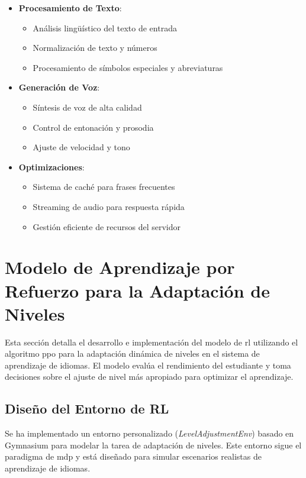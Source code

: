 \begin{itemize}
    \item \textbf{Procesamiento de Texto}:
    \begin{itemize}
        \item Análisis lingüístico del texto de entrada
        \item Normalización de texto y números
        \item Procesamiento de símbolos especiales y abreviaturas
    \end{itemize}

    \item \textbf{Generación de Voz}:
    \begin{itemize}
        \item Síntesis de voz de alta calidad
        \item Control de entonación y prosodia
        \item Ajuste de velocidad y tono
    \end{itemize}

    \item \textbf{Optimizaciones}:
    \begin{itemize}
        \item Sistema de caché para frases frecuentes
        \item Streaming de audio para respuesta rápida
        \item Gestión eficiente de recursos del servidor
    \end{itemize}
\end{itemize}

\section{Modelo de Aprendizaje por Refuerzo para la Adaptación de Niveles}
\label{ppo-model}

Esta sección detalla el desarrollo e implementación del modelo de \gls{rl} utilizando el algoritmo \gls{ppo} para la adaptación dinámica de niveles en el sistema de aprendizaje de idiomas. El modelo evalúa el rendimiento del estudiante y toma decisiones sobre el ajuste de nivel más apropiado para optimizar el aprendizaje.

\subsection{Diseño del Entorno de RL}
\label{diseno-entorno-rl}

Se ha implementado un entorno personalizado (\textit{LevelAdjustmentEnv}) basado en Gymnasium para modelar la tarea de adaptación de niveles. Este entorno sigue el paradigma de \gls{mdp} y está diseñado para simular escenarios realistas de aprendizaje de idiomas.

